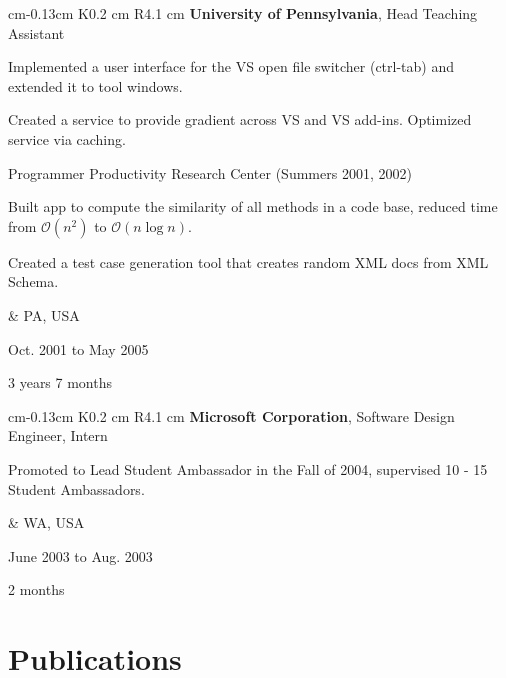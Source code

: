\vspace{0.2 cm}
\begin{tabularx}{
     cm-0.13cm
}{
    K{0.2 cm}
    R{4.1 cm}
}
    \textbf{University of Pennsylvania}, Head Teaching Assistant

    \vspace{0.10 cm}

    \begin{highlights}
        \item Implemented a user interface for the VS open file switcher (ctrl-tab) and extended it to tool windows.
        \item Created a service to provide gradient across VS and VS add-ins. Optimized service via caching.
        \item Programmer Productivity Research Center (Summers 2001, 2002)
        \item Built app to compute the similarity of all methods in a code base, reduced time from $\mathcal{O}(n^2)$ to $\mathcal{O}(n \log n)$. 
        \item Created a test case generation tool that creates random XML docs from XML Schema.
    \end{highlights}
    &
    PA, USA

    Oct. 2001 to May 2005

    3 years 7 months
\end{tabularx}

\vspace{0.2 cm}
\begin{tabularx}{
     cm-0.13cm
}{
    K{0.2 cm}
    R{4.1 cm}
}
    \textbf{Microsoft Corporation}, Software Design Engineer, Intern

    \vspace{0.10 cm}

    \begin{highlights}
        \item Promoted to Lead Student Ambassador in the Fall of 2004, supervised 10 - 15 Student Ambassadors.
    \end{highlights}
    &
    WA, USA

    June 2003 to Aug. 2003

    2 months
\end{tabularx}



\section{Publications}

